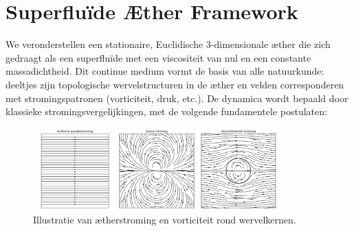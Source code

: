 \section{Superfluïde Æther Framework}

We veronderstellen een stationaire, Euclidische 3-dimensionale æther die zich gedraagt als een superfluïde met een viscositeit van nul en een constante massadichtheid. Dit continue medium vormt de basis van alle natuurkunde: deeltjes zijn topologische wervelstructuren in de æther en velden corresponderen met stromingspatronen (vorticiteit, druk, etc.). De dynamica wordt bepaald door klassieke stromingsvergelijkingen, met de volgende fundamentele postulaten:

\begin{figure}[htbp]
    \centering
    \includegraphics[width=0.85\textwidth]{03-combined_flow_nl}
    \caption{Illustratie van ætherstroming en vorticiteit rond wervelkernen.}
    \label{fig:vortexfields}
\end{figure}
